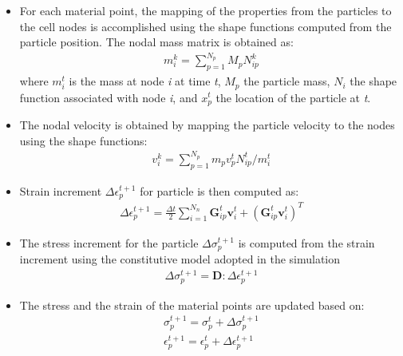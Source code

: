\begin{itemize}
\item
For each material point, the mapping of the properties from the particles to 
the cell nodes is accomplished using the shape functions computed from the 
particle position. The nodal mass matrix is obtained as:
\begin{align}
\mathit{m}_{\mathit{i}}^{\mathit{k}} = 
\sum\limits_{\mathit{p}=1}^{\mathit{N}_{\mathit{p}}} \mathit{M}_{\mathit{p}} 
\mathit{N}_{\mathit{ip}}^{\mathit{k}} 
\end{align}
where $\mathit{m}_{i}^{t}$ is the mass at node \textit{i} at time \textit{t}, 
$\mathit{M}_{\mathit{p}}$ the particle mass, $\mathit{N}_{\mathit{i}}$ the 
shape function associated with node \textit{i}, and 
$\mathit{x}_{\mathit{p}}^{\mathit{t}}$ the location of the particle at 
\textit{t}.
\item
The nodal velocity is obtained by mapping the particle velocity to the nodes 
using the shape functions:
\begin{align}
\mathbf{\mathit{v}}_{\mathit{i}}^{\mathit{k}} = 
\sum\limits_{\mathit{p}=1}^{\mathit{N}_{\mathit{p}}} \mathit{m}_{\mathit{p}} 
\mathbf{\mathit{v}}_{\mathit{p}}^{\mathit{t}} 
\mathbf{\mathit{N}}_{\mathit{ip}}^{\mathit{t}} / 
\mathit{m}_{\mathit{i}}^{\mathit{t}}
\end{align}
\item
Strain increment $\Delta \epsilon_{p}^{t+1}$ for particle is then computed as:
\begin{align}
\Delta \epsilon_{p}^{t+1} = \frac{\Delta t}{2} 
\sum\limits_{\mathit{i}=1}^{\mathit{N}_{n}}{\mathbf{G}_{\mathit{ip}}^{t} 
\mathbf{v}_{\mathit{i}}^{t} + (\mathbf{G}_{\mathit{ip}}^{t} 
\mathbf{v}_{\mathit{i}}^{t})^{\mathit{T}}}
\end{align}
\item
The stress increment for the particle $\Delta \sigma_{\mathit{p}}^{t+1}$ is 
computed from the strain increment using the constitutive model adopted in the 
simulation
\begin{align}
\Delta \sigma_{\mathit{p}}^{t+1} = \mathbf{D} : \Delta \epsilon_{p}^{t+1}
\end{align}
\item
The stress and the strain of the material points are updated based on:
\begin{align}
\nonumber
\sigma_{\mathit{p}}^{t+1} = \sigma_{\mathit{p}}^{t} + \Delta 
\sigma_{\mathit{p}}^{t+1} \\
\epsilon_{p}^{t+1} =\epsilon_{p}^{t} + \Delta \epsilon_{p}^{t+1}
\end{align}

\end{itemize}
